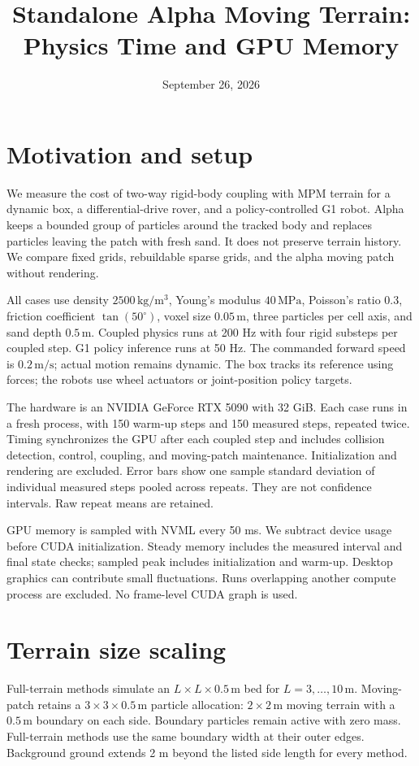 \documentclass[10pt]{article}
\title{Standalone Alpha Moving Terrain: Physics Time and GPU Memory}
\author{}
\date{September 26, 2026}
\begin{document}
\maketitle
\section{Motivation and setup}
We measure the cost of two-way rigid-body coupling with MPM terrain for a dynamic box, a differential-drive rover, and a policy-controlled G1 robot. Alpha keeps a bounded group of particles around the tracked body and replaces particles leaving the patch with fresh sand. It does not preserve terrain history. We compare fixed grids, rebuildable sparse grids, and the alpha moving patch without rendering.

All cases use density $2500\,\mathrm{kg/m^3}$, Young's modulus $40\,\mathrm{MPa}$, Poisson's ratio 0.3, friction coefficient $\tan(50^\circ)$, voxel size $0.05\,\mathrm{m}$, three particles per cell axis, and sand depth $0.5\,\mathrm{m}$. Coupled physics runs at 200 Hz with four rigid substeps per coupled step. G1 policy inference runs at 50 Hz. The commanded forward speed is $0.2\,\mathrm{m/s}$; actual motion remains dynamic. The box tracks its reference using forces; the robots use wheel actuators or joint-position policy targets.

The hardware is an NVIDIA GeForce RTX 5090 with 32 GiB. Each case runs in a fresh process, with 150 warm-up steps and 150 measured steps, repeated twice. Timing synchronizes the GPU after each coupled step and includes collision detection, control, coupling, and moving-patch maintenance. Initialization and rendering are excluded. Error bars show one sample standard deviation of individual measured steps pooled across repeats. They are not confidence intervals. Raw repeat means are retained.

GPU memory is sampled with NVML every 50 ms. We subtract device usage before CUDA initialization. Steady memory includes the measured interval and final state checks; sampled peak includes initialization and warm-up. Desktop graphics can contribute small fluctuations. Runs overlapping another compute process are excluded. No frame-level CUDA graph is used.

\section{Terrain size scaling}
Full-terrain methods simulate an $L\times L\times0.5\,\mathrm{m}$ bed for $L=3,\ldots,10\,\mathrm{m}$. Moving-patch retains a $3\times3\times0.5\,\mathrm{m}$ particle allocation: $2\times2\,\mathrm{m}$ moving terrain with a $0.5\,\mathrm{m}$ boundary on each side. Boundary particles remain active with zero mass. Full-terrain methods use the same boundary width at their outer edges. Background ground extends 2 m beyond the listed side length for every method.
\end{document}
